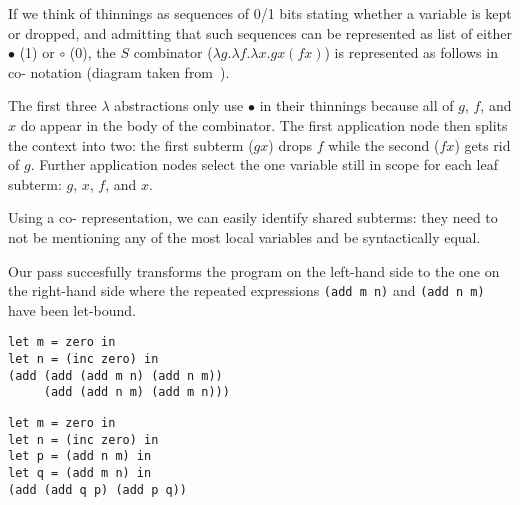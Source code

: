 If we think of thinnings as sequences of 0/1 bits stating whether a variable
is kept or dropped, and admitting that such sequences can be represented as
list of either $\bullet$ (1) or $\circ$ (0), the $S$ combinator
($\lambda g. \lambda f. \lambda x. g x (f x)$) is represented as follows in
co-\DeBruijn{} notation (diagram taken from~\cite{MANUAL:draft/Allais22}).

\begin{center}
  \codebruijnexamplegraph{}
\end{center}

The first three $\lambda$ abstractions only use $\bullet$ in their thinnings
because all of $g$, $f$, and $x$ do appear in the body of the combinator.
%
The first application node then splits the context into two: the first subterm
($g x$) drops $f$ while the second ($f x$) gets rid of $g$.
%
Further application nodes select the one variable still in scope for each
leaf subterm: $g$, $x$, $f$, and $x$.

Using a co-\DeBruijn{} representation, we can easily identify shared subterms:
they need to not be mentioning any of the most local variables and be
syntactically equal.


Our pass succesfully transforms the program on the left-hand side to the
one on the right-hand side where the repeated expressions
\texttt{(add m n)} and \texttt{(add n m)} have been let-bound.

\begin{minipage}[t]{0.4\textwidth}
\begin{Verbatim}
let m = zero in
let n = (inc zero) in
(add (add (add m n) (add n m))
     (add (add n m) (add m n)))
\end{Verbatim}
\end{minipage}\hfill\begin{minipage}[t]{0.4\textwidth}
\begin{Verbatim}
let m = zero in
let n = (inc zero) in
let p = (add n m) in
let q = (add m n) in
(add (add q p) (add p q))
\end{Verbatim}
\end{minipage}
